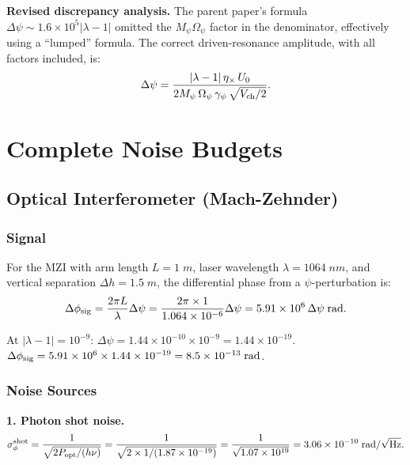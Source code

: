 \documentclass[aps,prd,twocolumn,superscriptaddress,nofootinbib]{revtex4-2}
\newcommand{\ee}[1]{\times 10^{#1}}
\begin{document}
\textbf{Revised discrepancy analysis.}
The parent paper's formula
$\Delta\psi \sim 1.6\ee{5}|\lambda-1|$ omitted the
$M_\psi\Omega_\psi$ factor in the denominator, effectively
using a ``lumped'' formula.  The correct driven-resonance
amplitude, with all factors included, is:
\begin{equation}
\Delta\psi = \frac{|\lambda-1|\,\eta_\times\,U_0}{2M_\psi\,\Omega_\psi\,\gamma_\psi\,\sqrt{V_{\rm ch}/2}}.
\label{eq:corrected-amplitude}
\end{equation}

\section{Complete Noise Budgets}
\label{sec:noise}

\subsection{Optical Interferometer (Mach-Zehnder)}

\subsubsection{Signal}

For the MZI with arm length $L = 1\;\si{m}$, laser wavelength
$\lambda = 1064\;\si{nm}$, and vertical separation
$\Delta h = 1.5\;\si{m}$, the differential phase from a
$\psi$-perturbation is:
\begin{equation}
\Delta\phi_{\rm sig} = \frac{2\pi L}{\lambda}\Delta\psi
= \frac{2\pi \times 1}{1.064\ee{-6}}\Delta\psi
= 5.91\ee{6}\,\Delta\psi\;\si{rad}.
\end{equation}

At $|\lambda-1| = 10^{-9}$:
$\Delta\psi = 1.44\ee{-10} \times 10^{-9} = 1.44\ee{-19}$.
$\Delta\phi_{\rm sig} = 5.91\ee{6} \times 1.44\ee{-19} = 8.5\ee{-13}\;\si{rad}$.

\subsubsection{Noise Sources}

\textbf{1. Photon shot noise.}
\begin{equation}
\sigma_\phi^{\rm shot} = \frac{1}{\sqrt{2P_{\rm opt}/(h\nu)}}
= \frac{1}{\sqrt{2\times1/(1.87\ee{-19})}}
= \frac{1}{\sqrt{1.07\ee{19}}} = 3.06\ee{-10}\;\si{rad/\sqrt{Hz}}.
\end{equation}
\end{document}
